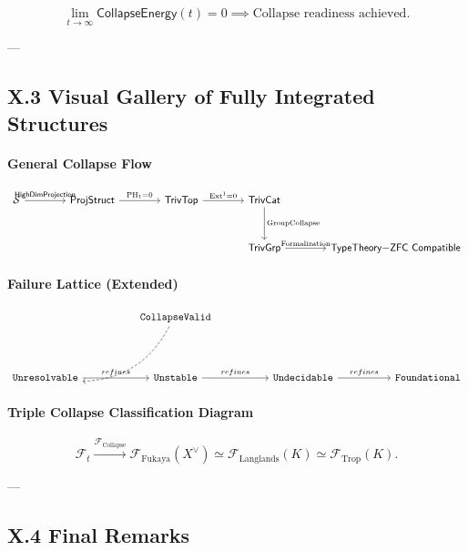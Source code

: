 \documentclass[11pt]{article}
\begin{document}
\[
\lim_{t \to \infty} \mathsf{CollapseEnergy}(t) = 0 \implies \text{Collapse readiness achieved}.
\]

---

\subsection*{X.3 Visual Gallery of Fully Integrated Structures}

\paragraph{General Collapse Flow}

\[
\begin{tikzcd}[column sep=4em, row sep=3em]
\mathcal{S} \arrow[r, "\mathsf{HighDimProjection}"]
& \mathsf{ProjStruct} \arrow[r, "\mathrm{PH}_1 = 0"]
& \mathsf{TrivTop} \arrow[r, "\mathrm{Ext}^1 = 0"]
& \mathsf{TrivCat} \arrow[d, "\mathrm{GroupCollapse}"] \\
& & & \mathsf{TrivGrp} \arrow[r, "\mathrm{Formalization}"]
& \mathsf{TypeTheory{-}ZFC\ Compatible}
\end{tikzcd}
\]


\paragraph{Failure Lattice (Extended)}

\[
\begin{tikzcd}[column sep=1.8cm, row sep=1.5cm]
& \texttt{CollapseValid} \arrow[dl, dashed, bend left] \\
\texttt{Unresolvable} \arrow[r, "refines"]
& \texttt{Unstable} \arrow[r, "refines"]
& \texttt{Undecidable} \arrow[r, "refines"]
& \texttt{Foundational}
\end{tikzcd}
\]

\paragraph{Triple Collapse Classification Diagram}

\[
\mathcal{F}_t \xrightarrow{\mathcal{F}_{\mathrm{Collapse}}}
\mathcal{F}_{\mathrm{Fukaya}}(X^\vee) \simeq
\mathcal{F}_{\mathrm{Langlands}}(K) \simeq
\mathcal{F}_{\mathrm{Trop}}(K).
\]

---

\subsection*{X.4 Final Remarks}
\end{document}
